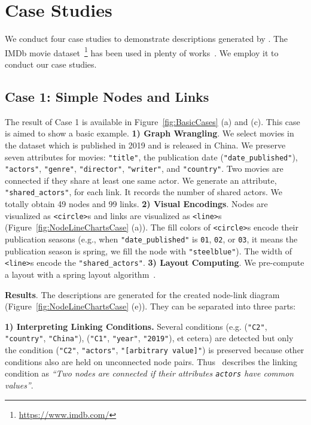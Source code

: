 \section{Case Studies}
We conduct four case studies to demonstrate descriptions generated by \ApproachName.
The IMDb movie dataset~\footnote{\url{https://www.imdb.com/}} has been used in plenty of works~\cite{DBLP:journals/tvcg/SrinivasanPEB18, DBLP:journals/pvldb/KrishnanWWFG16, DBLP:conf/ieeevast/BigelowNML19}.
We employ it to conduct our case studies.


\subsection{Case 1: Simple Nodes and Links}\label{sec:imdb_movies}
The result of Case 1 is available in Figure~\ref{fig:BasicCases} (a) and (c).
This case is aimed to show a basic example.
\textbf{1) Graph Wrangling}. We select movies in the dataset which is published in 2019 and is released in China.
We preserve seven attributes for movies: \texttt{"title"}, the publication date (\texttt{"date\_published"}), \texttt{"actors"}, \texttt{"genre"}, \texttt{"director"}, \texttt{"writer"}, and \texttt{"country"}.
Two movies are connected if they share at least one same actor.
We generate an attribute, \texttt{"shared\_actors"}, for each link. 
It records the number of shared actors.
We totally obtain 49 nodes and 99 links.
\textbf{2) Visual Encodings}. 
Nodes are visualized as \texttt{<circle>}s and links are visualized as \texttt{<line>}s (Figure~\ref{fig:NodeLineChartsCase} (a)).
The fill colors of \texttt{<circle>}s encode their publication seasons (e.g., when \texttt{"date\_published"} is \texttt{01}, \texttt{02}, or \texttt{03}, it means the publication season is spring, we fill the node with \texttt{"steelblue"}).
The width of \texttt{<line>}s encode the \texttt{"shared\_actors"}.
\textbf{3) Layout Computing}. 
We pre-compute a layout with a spring layout algorithm~\cite{DBLP:journals/spe/FruchtermanR91}.

\textbf{Results}.
The descriptions are generated for the created node-link diagram (Figure~\ref{fig:NodeLineChartsCase} (e)).
They can be separated into three parts:

\textbf{1) Interpreting Linking Conditions.} Several conditions (e.g. (\texttt{"C2"}, \texttt{"country"}, \texttt{"China"}), (\texttt{"C1"}, \texttt{"year"}, \texttt{"2019"}), et cetera) are detected but only the condition (\texttt{"C2"}, \texttt{"actors"}, \texttt{"[arbitrary value]"}) is preserved because other conditions also are held on unconnected node pairs.
Thus \ApproachName~describes the linking condition as \textit{``Two nodes are connected if their attributes {\texttt{actors}} have common values''}.


